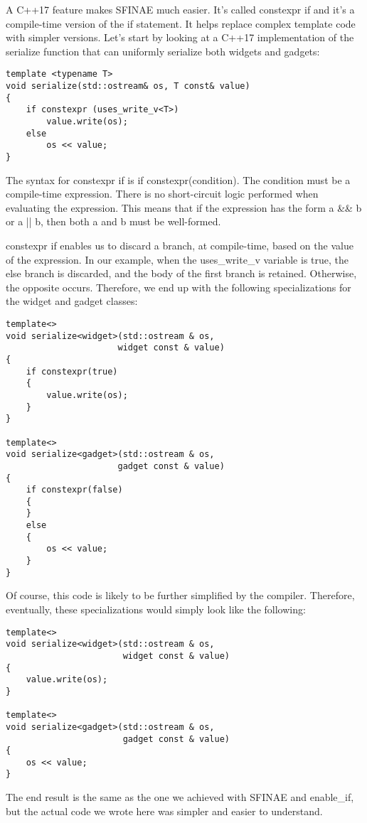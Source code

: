 A C++17 feature makes SFINAE much easier. It’s called constexpr if and it’s a compile-time version of the if statement. It helps replace complex template code with simpler versions. Let’s start by looking at a C++17 implementation of the serialize function that can uniformly serialize both widgets and gadgets:

\begin{lstlisting}[style=styleCXX]
template <typename T>
void serialize(std::ostream& os, T const& value)
{
	if constexpr (uses_write_v<T>)
		value.write(os);
	else
		os << value;
}
\end{lstlisting}

The syntax for constexpr if is if constexpr(condition). The condition must be a compile-time expression. There is no short-circuit logic performed when evaluating the expression. This means that if the expression has the form a \&\& b or a || b, then both a and b must be well-formed.

constexpr if enables us to discard a branch, at compile-time, based on the value of the expression. In our example, when the uses\_write\_v variable is true, the else branch is discarded, and the body of the first branch is retained. Otherwise, the opposite occurs. Therefore, we end up with the following specializations for the widget and gadget classes:

\begin{lstlisting}[style=styleCXX]
template<>
void serialize<widget>(std::ostream & os,
                      widget const & value)
{
	if constexpr(true)
	{
		value.write(os);
	}
}

template<>
void serialize<gadget>(std::ostream & os,
                      gadget const & value)
{
	if constexpr(false)
	{
	}
	else
	{
		os << value;
	}
}
\end{lstlisting}

Of course, this code is likely to be further simplified by the compiler. Therefore, eventually, these specializations would simply look like the following:

\begin{lstlisting}[style=styleCXX]
template<>
void serialize<widget>(std::ostream & os,
                       widget const & value)
{
	value.write(os);
}

template<>
void serialize<gadget>(std::ostream & os,
					   gadget const & value)
{
	os << value;
}
\end{lstlisting}

The end result is the same as the one we achieved with SFINAE and enable\_if, but the actual code we wrote here was simpler and easier to understand.

